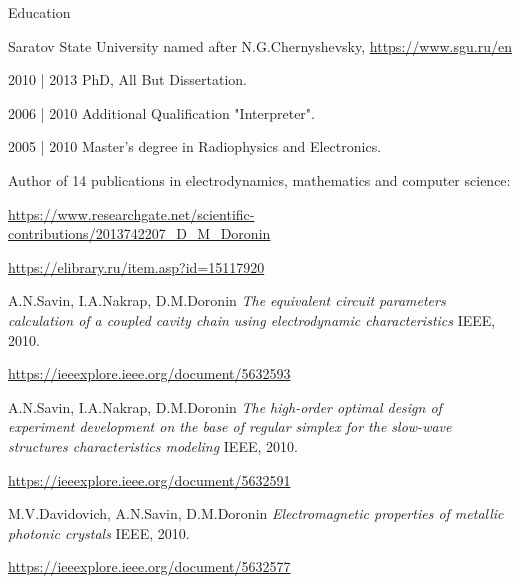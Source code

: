 \documentclass{resume}
\begin{document}

\begin{rSection}{Education}

\begin{rSubsection}{Saratov State University named after N.G.Chernyshevsky, \url{https://www.sgu.ru/en}}{}{}{}

      2010 | 2013 PhD, All But Dissertation.

      2006 | 2010 Additional Qualification "Interpreter".

      2005 | 2010 Master's degree in Radiophysics and Electronics.


      Author of 14 publications in electrodynamics, mathematics and computer science:
      \item[] \url{https://www.researchgate.net/scientific-contributions/2013742207_D_M_Doronin}
      \item[] \url{https://elibrary.ru/item.asp?id=15117920}

\bigskip
\renewcommand{\section}[2]{\textbf{SELECTED PUBLICATIONS}}
\begin{thebibliography}{}

    \bibitem{} 
    A.N.Savin, I.A.Nakrap, D.M.Doronin
    \textit{The equivalent circuit parameters calculation of a coupled cavity chain using electrodynamic characteristics}
    IEEE, 2010.

    \url{https://ieeexplore.ieee.org/document/5632593}

    \bibitem{} 
    A.N.Savin, I.A.Nakrap, D.M.Doronin
    \textit{The high-order optimal design of experiment development on the base of regular simplex for the slow-wave structures characteristics modeling}
    IEEE, 2010.

    \url{https://ieeexplore.ieee.org/document/5632591}


    M.V.Davidovich, A.N.Savin, D.M.Doronin
    \textit{Electromagnetic properties of metallic photonic crystals}
    IEEE, 2010.

    \url{https://ieeexplore.ieee.org/document/5632577}
\end{thebibliography}

\end{rSubsection}
\end{rSection}
\end{document}
